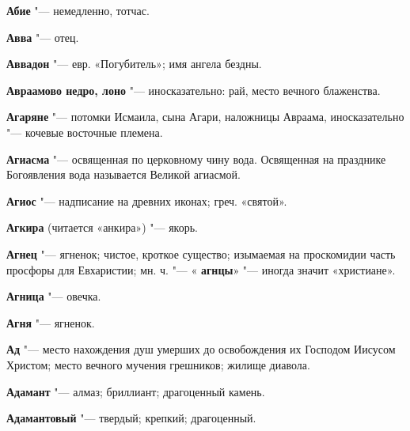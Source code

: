\renewcommand{\ornament}{uzor_begin_4}
 
\begin{mymulticols}{2}\footnotesize



\noindent\textbf{Абие} "--- немедленно, тотчас. 




\noindent\textbf{Авва} "--- отец. 




\noindent\textbf{Аввадон} "--- евр. «Погубитель»; имя ангела бездны. 




\noindent\textbf{Авраамово недро, лоно} "--- иносказательно: рай, место вечного блаженства. 




\noindent\textbf{Агаряне} "--- потомки Исмаила, сына Агари, наложницы Авраама, иносказательно "--- кочевые восточные племена. 




\noindent\textbf{Агиасма} "--- освященная по церковному чину вода. Освященная на празднике Богоявления вода называется Великой агиасмой. 




\noindent\textbf{Агиос} "--- надписание на древних иконах; греч. «святой». 




\noindent\textbf{Агкира} (читается «анкира») "--- якорь. 




\noindent\textbf{Агнец} "--- ягненок; чистое, кроткое существо; изымаемая на проскомидии часть просфоры для Евхаристии; мн. ч. "--- « \noindent\textbf{агнцы}» "--- иногда значит «христиане». 




\noindent\textbf{Агница} "--- овечка. 




\noindent\textbf{Агня} "--- ягненок. 




\noindent\textbf{Ад} "--- место нахождения душ умерших до освобождения их Господом Иисусом Христом; место вечного мучения грешников; жилище диавола. 




\noindent\textbf{Адамант} "--- алмаз; бриллиант; драгоценный камень. 




\noindent\textbf{Адамантовый} "--- твердый; крепкий; драгоценный. 





\end{mymulticols}

